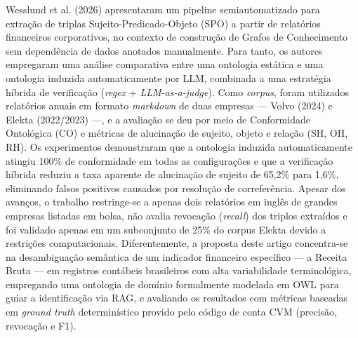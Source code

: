\documentclass[12pt,a4paper]{article}
\begin{document}
Wesslund et al. (2026) apresentaram um pipeline semiautomatizado para extração de triplas Sujeito-Predicado-Objeto (SPO) a partir de relatórios financeiros corporativos, no contexto de construção de Grafos de Conhecimento sem dependência de dados anotados manualmente. Para tanto, os autores empregaram uma análise comparativa entre uma ontologia estática e uma ontologia induzida automaticamente por LLM, combinada a uma estratégia híbrida de verificação (\textit{regex} + \textit{LLM-as-a-judge}). Como \textit{corpus}, foram utilizados relatórios anuais em formato \textit{markdown} de duas empresas --- Volvo (2024) e Elekta (2022/2023) ---, e a avaliação se deu por meio de Conformidade Ontológica (CO) e métricas de alucinação de sujeito, objeto e relação (SH, OH, RH). Os experimentos demonstraram que a ontologia induzida automaticamente atingiu 100\% de conformidade em todas as configurações e que a verificação híbrida reduziu a taxa aparente de alucinação de sujeito de 65,2\% para 1,6\%, eliminando falsos positivos causados por resolução de correferência. Apesar dos avanços, o trabalho restringe-se a apenas dois relatórios em inglês de grandes empresas listadas em bolsa, não avalia revocação (\textit{recall}) dos triplos extraídos e foi validado apenas em um subconjunto de 25\% do corpus Elekta devido a restrições computacionais. Diferentemente, a proposta deste artigo concentra-se na desambiguação semântica de um indicador financeiro específico --- a Receita Bruta --- em registros contábeis brasileiros com alta variabilidade terminológica, empregando uma ontologia de domínio formalmente modelada em OWL para guiar a identificação via RAG, e avaliando os resultados com métricas baseadas em \textit{ground truth} determinístico provido pelo código de conta CVM (precisão, revocação e F1).
\end{document}
